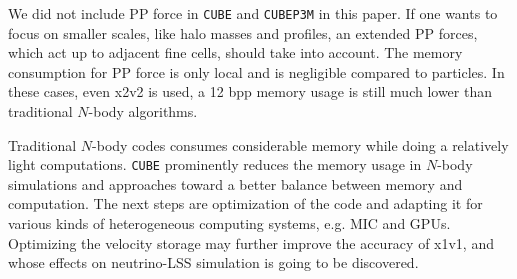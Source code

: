 \documentclass[10pt,twocolumn,preprint]{emulateapj}
\newcommand{\tcb}{\textcolor{blue}}
\begin{document}
We did not include PP force in {\tt CUBE} and {\tt CUBEP3M} in this paper. If one wants to focus on smaller scales, like halo masses and profiles, an extended PP forces, which act up to adjacent fine cells, should take into account. The memory consumption for PP force is only local and is negligible compared to particles. In these cases, even x2v2 is used, a 12 bpp memory usage is still much lower than traditional $N$-body algorithms.

Traditional $N$-body codes consumes considerable memory while doing a relatively light computations. {\tt CUBE} prominently reduces the memory usage in $N$-body simulations and approaches toward a better balance between memory and computation. The next steps are optimization of the code and adapting it for various kinds of heterogeneous computing systems, e.g. MIC and GPUs. Optimizing the velocity storage may further improve the accuracy of x1v1, and whose effects on neutrino-LSS simulation is going to be discovered.








\acknowledgements



\end{document}
